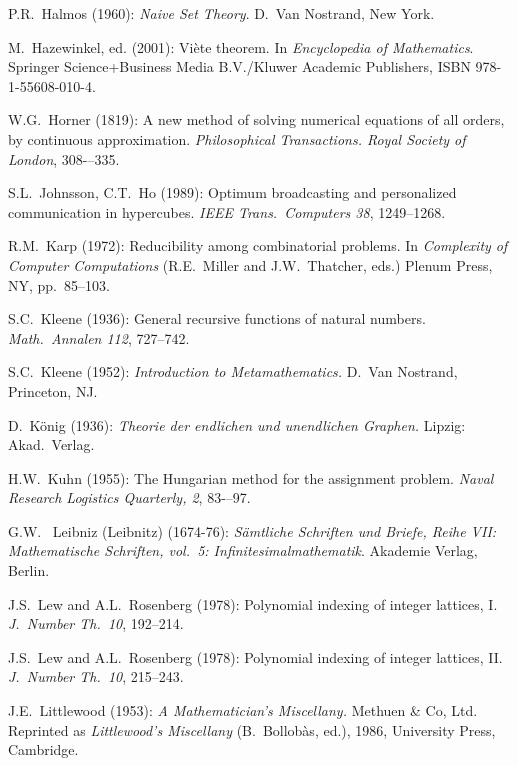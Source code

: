 \begin{thebibliography}{999}

P.R.~Halmos (1960):
{\it Naive Set Theory}.
D.~Van Nostrand, New York.

M.~Hazewinkel, ed. (2001): %
Vi\`{e}te theorem.  In {\it Encyclopedia of Mathematics}.
Springer Science+Business Media B.V./Kluwer Academic Publishers,
ISBN 978-1-55608-010-4.

W.G.~Horner (1819): 
A new method of solving numerical equations of all orders, by
continuous approximation. {\it Philosophical Transactions. Royal
Society of London}, 308-–335.




S.L.~Johnsson, C.T.~Ho (1989):
Optimum broadcasting and personalized communication in hypercubes.
{\it IEEE Trans.~Computers 38}, 1249--1268.



R.M.~Karp (1972): Reducibility among combinatorial problems.  In {\it
Complexity of Computer Computations} (R.E.~Miller and J.W.~Thatcher,
eds.)  Plenum Press, NY, pp.~85--103.

S.C.~Kleene (1936): General recursive functions of natural numbers.
{\it Math.~Annalen 112}, 727--742.

S.C.~Kleene (1952):
{\it Introduction to Metamathematics.}
D.~Van Nostrand, Princeton, NJ.

D.~K\"onig (1936):
{\it Theorie der endlichen und unendlichen Graphen.}  Lipzig: Akad.~Verlag.

H.W.~Kuhn (1955): The Hungarian method for the assignment problem.
{\it Naval Research Logistics Quarterly, 2}, 83-–97.


G.W.~ Leibniz (Leibnitz) (1674-76):
{\it S\"{a}mtliche Schriften und Briefe, Reihe VII: Mathematische
  Schriften, vol.~5: Infinitesimalmathematik}.
Akademie Verlag, Berlin.

J.S.~Lew and A.L.~Rosenberg (1978): Polynomial indexing of integer
lattices, I.  {\it J.~Number Th.~10}, 192--214.
 
J.S.~Lew and A.L.~Rosenberg (1978): Polynomial indexing of integer
lattices, II.  {\it J.~Number Th.~10}, 215--243.

J.E.~Littlewood (1953):
{\it A Mathematician's Miscellany.}
Methuen \& Co, Ltd.
Reprinted as {\it Littlewood's Miscellany} (B.~Bollob\`{a}s, ed.),
1986, University Press, Cambridge.



\end{thebibliography}
